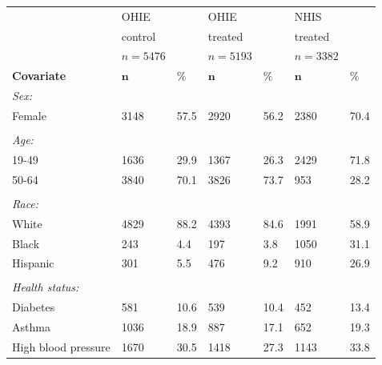 \documentclass[12pt]{article}
\begin{document}
\begin{appendices}
\begin{singlespace}
\begin{longtable}{lllllll}
  & OHIE &  & OHIE &  & NHIS &  \\ 
    & control &  & treated &  &treated &   \\ 
  & $n=5476$ &  & $n=5193$ &  & $n=3382$ &  \\  
  \hline   
    \hline   
 \textbf{Covariate} &  $\mathbf{n}$ & $\mathbf{\%}$ & $\mathbf{n}$ & $\mathbf{\%}$ & $\mathbf{n}$ & $\mathbf{\%}$ \\ 
\hline
\textit{Sex:} &  & & &  &  & \\ 

\hspace{3mm} Female & 3148 & 57.5 & 2920 & 56.2 & 2380 & 70.4 \\ 
 &  & & &  &  & \\ 
\textit{Age:} &  & & &  &  & \\ 
\hspace{3mm}19-49 & 1636 & 29.9 & 1367 & 26.3 & 2429 & 71.8  \\ 

\hspace{3mm}50-64 & 3840 & 70.1 & 3826 & 73.7 & 953 & 28.2 \\ 
 &  & & &  &  & \\ 
\textit{Race:} &  & & &  &  & \\ 
\hspace{3mm}White & 4829 & 88.2 & 4393 & 84.6 & 1991 & 58.9  \\ 

\hspace{3mm}Black & 243 & 4.4 & 197 & 3.8 & 1050 & 31.1  \\ 

\hspace{3mm}Hispanic & 301 & 5.5 & 476 & 9.2 & 910 & 26.9  \\ 
 &  & & &  &  & \\ 
\textit{Health status:} &  & & &  &  & \\ 
\hspace{3mm}Diabetes & 581 & 10.6 & 539 & 10.4 & 452 & 13.4 \\ 

\hspace{3mm}Asthma & 1036 & 18.9 & 887 & 17.1 & 652 & 19.3  \\ 

\hspace{3mm}High blood pressure & 1670 & 30.5 & 1418 & 27.3 & 1143 & 33.8  \\ 
  

\end{longtable}
\end{singlespace}
\end{appendices}
\end{document}
